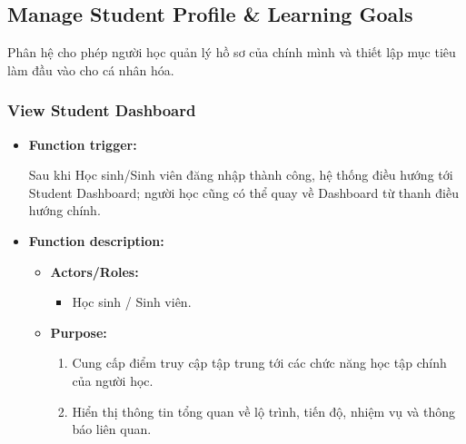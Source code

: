 \documentclass[12pt,a4paper,oneside]{report}
\begin{document}
\subsection{Manage Student Profile \& Learning Goals}
\label{subsec:student-profile-learning-goals}

Phân hệ cho phép người học quản lý hồ sơ của chính mình và thiết lập mục tiêu làm đầu vào cho cá nhân hóa.

\subsubsection{View Student Dashboard}
\label{subsubsec:view-student-dashboard}

\begin{itemize}

    \item \textbf{Function trigger:}

    Sau khi Học sinh/Sinh viên đăng nhập thành công, hệ thống điều hướng tới Student Dashboard; người học cũng có thể quay về Dashboard từ thanh điều hướng chính.

    \item \textbf{Function description:}

    \begin{itemize}

        \item \textbf{Actors/Roles:}
        \begin{itemize}
            \item Học sinh / Sinh viên.
        \end{itemize}

        \item \textbf{Purpose:}
        \begin{enumerate}
            \item Cung cấp điểm truy cập tập trung tới các chức năng học tập chính của người học.
            \item Hiển thị thông tin tổng quan về lộ trình, tiến độ, nhiệm vụ và thông báo liên quan.
        \end{enumerate}


\end{itemize}
\end{itemize}
\end{document}
